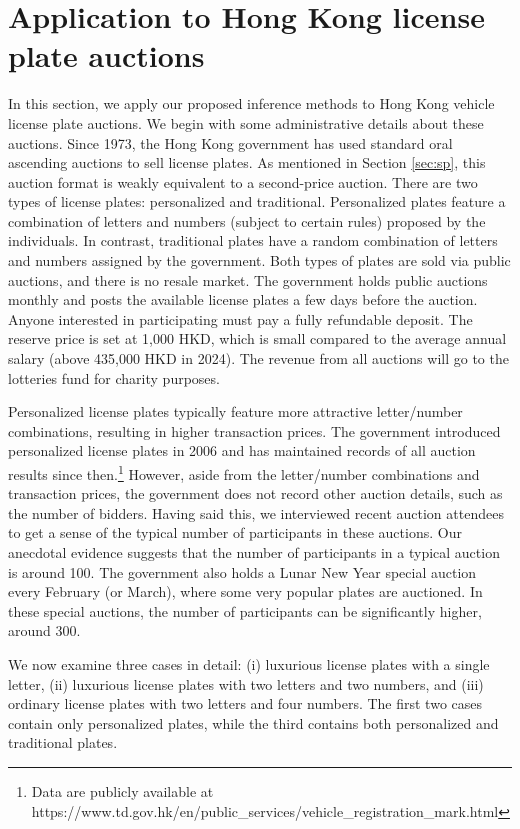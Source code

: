 
\section{Application to Hong Kong license plate auctions}
\label{sec:application}

In this section, we apply our proposed inference methods to Hong Kong vehicle license plate auctions. We begin with some administrative details about these auctions. Since 1973, the Hong Kong government has used standard oral ascending auctions to sell license plates. As mentioned in Section \ref{sec:sp}, this auction format is weakly equivalent to a second-price auction. There are two types of license plates: personalized and traditional. Personalized plates feature a combination of letters and numbers (subject to certain rules) proposed by the individuals. In contrast, traditional plates have a random combination of letters and numbers assigned by the government. Both types of plates are sold via public auctions, and there is no resale market. The government holds public auctions monthly and posts the available license plates a few days before the auction. Anyone interested in participating must pay a fully refundable deposit. The reserve price is set at 1,000 HKD, which is small compared to the average annual salary (above 435,000 HKD in 2024). The revenue from all auctions will go to the lotteries fund for charity purposes.

Personalized license plates typically feature more attractive letter/number combinations, resulting in higher transaction prices. The government introduced personalized license plates in 2006 and has maintained records of all auction results since then.\footnote{Data are publicly available at https://www.td.gov.hk/en/public\_services/vehicle\_registration\_mark.html} However, aside from the letter/number combinations and transaction prices, the government does not record other auction details, such as the number of bidders. Having said this, we interviewed recent auction attendees to get a sense of the typical number of participants in these auctions. Our anecdotal evidence suggests that the number of participants in a typical auction is around 100. The government also holds a Lunar New Year special auction every February (or March), where some very popular plates are auctioned. In these special auctions, the number of participants can be significantly higher, around 300.

We now examine three cases in detail: (i) luxurious license plates with a single letter, (ii) luxurious license plates with two letters and two numbers, and (iii) ordinary license plates with two letters and four numbers. 
The first two cases contain only personalized plates, while the third contains both personalized and traditional plates.

